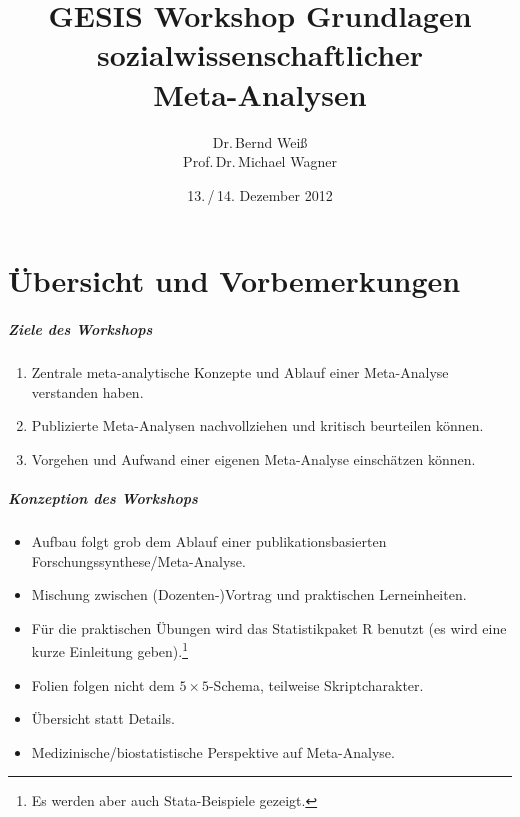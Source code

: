 \documentclass[%
handout%
]{beamer}\usepackage{graphicx, color}
\title[]{\large{GESIS Workshop \newline\newline Grundlagen\\ sozialwissenschaftlicher\\ Meta-Analysen}}
\date{13.\,/\,14. Dezember 2012}
\author[Dr.\,Bernd Weiß, Prof.\,Dr.\,Michael Wagner]{Dr.\,Bernd Weiß \\ Prof.\,Dr.\,Michael Wagner}
\institute[Universität zu Köln]{
  Forschungsinstitut für Soziologie\\
  Universität zu Köln\\ \vspace{2ex}
  \url{bernd.weiss@uni-koeln.de}\\
  \url{mwagner@wiso.uni-koeln.de}\\
  }
\begin{document}
\begin{frame}[plain]
\titlepage
\begin{flushright}
  \byncsa
\end{flushright}
\end{frame}


\part{Übersicht und Vorbemerkungen}\label{part:uebersicht}
\frame{\partpage}


\begin{frame}
  \frametitle{Ziele des Workshops}
  \begin{enumerate}
  \item Zentrale meta-analytische Konzepte und Ablauf einer Meta-Analyse verstanden haben.
  \item Publizierte Meta-Analysen nachvollziehen und kritisch beurteilen können.
  \item Vorgehen und Aufwand einer eigenen Meta-Analyse einschätzen können.
  \end{enumerate}
\end{frame}


\begin{frame}
  \frametitle{Konzeption des Workshops}
  \begin{itemize}
  \item Aufbau folgt grob dem Ablauf einer publikationsbasierten Forschungssynthese/Meta-Analyse.
  \item Mischung zwischen (Dozenten-)Vortrag und praktischen Lerneinheiten.
  \item Für die praktischen Übungen wird das Statistikpaket R benutzt (es wird
    eine kurze Einleitung geben).\footnote{Es werden aber auch
      Stata-Beispiele gezeigt.}
  \item Folien folgen nicht dem $5 \times 5$-Schema, teilweise Skriptcharakter.
  \item Übersicht statt Details.
  \item Medizinische/biostatistische Perspektive auf Meta-Analyse.
  \end{itemize}
\end{frame}
\end{document}
